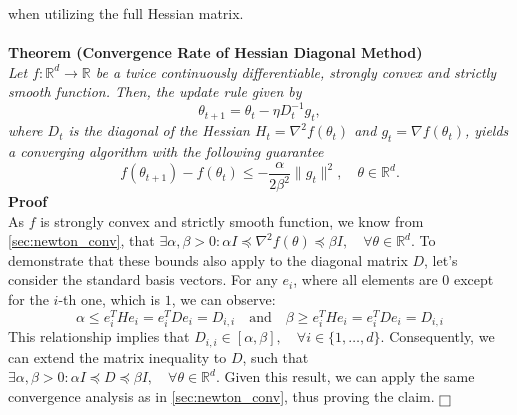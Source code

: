 when utilizing the full Hessian matrix.
\\\\
\noindent\textbf{Theorem (Convergence Rate of Hessian Diagonal Method)} \\
\textit{Let $f: \mathbb{R}^d \to \mathbb{R}$ be a twice continuously differentiable, strongly convex and strictly smooth function. Then, the update rule given by
    \[ \theta_{t+1} = \theta_t - \eta D_t^{-1} g_t, \]
    where $D_t$ is the diagonal of the Hessian $H_t = \nabla^2 f(\theta_t)$ and $g_t = \nabla f(\theta_t)$, yields a converging algorithm with the following guarantee
    \[ f(\theta_{t+1}) - f(\theta_t) \leq - \frac{\alpha}{2\beta^{2}} \|g_t\|^2, \quad \theta \in \mathbb{R}^d. \]
   }\noindent\textbf{Proof}\\ As $f$ is strongly convex and strictly smooth function, we know from \ref{sec:newton_conv}, that $\exists \alpha, \beta > 0 : \alpha I \preceq \nabla^2 f(\theta) \preceq \beta I, \quad \forall \theta \in \mathbb{R}^d$.
    To demonstrate that these bounds also apply to the diagonal matrix $D$, let's consider the standard basis vectors.
For any $e_i$, where all elements are $0$ except for the $i$-th one, which is $1$, we can observe:
\begin{equation}
       \alpha \leq e_i^T H e_i = e_i^T D e_i = D_{i,i} \quad \text{and} \quad \beta \geq e_i^T H e_i = e_i^T D e_i = D_{i,i}
\end{equation}   
This relationship implies that $D_{i,i} \in [\alpha,\beta], \quad \forall i \in \{1, \ldots, d\}$.
Consequently, we can extend the matrix inequality to $D$, such that   
   $\exists \alpha, \beta > 0 : \alpha I \preceq D \preceq \beta I, \quad \forall \theta \in \mathbb{R}^d$.   
Given this result, we can apply the same convergence analysis as in \ref{sec:newton_conv}, thus proving the claim. $ \hfill \fbox{\phantom{\rule{.2ex}{.2ex}}}$
\\







